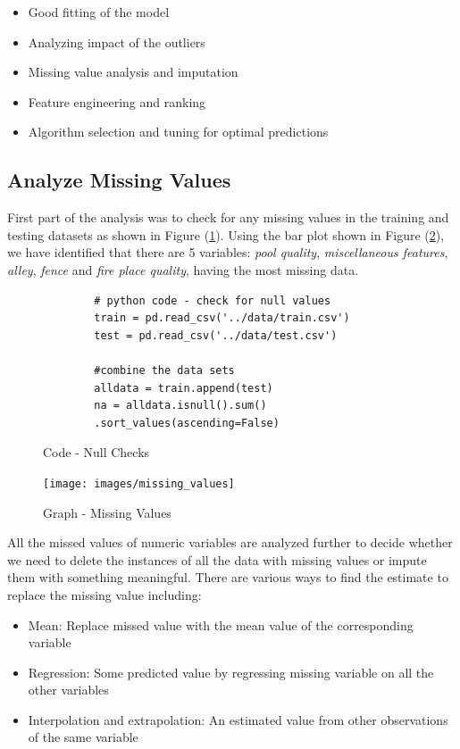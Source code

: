 \documentclass[sigconf]{acmart}
\begin{document}
	\begin{itemize}
		\item Good fitting of the model
		\item Analyzing impact of the outliers
		\item Missing value analysis and imputation
		\item Feature engineering and ranking
		\item Algorithm selection and tuning for optimal predictions
	\end{itemize}
	
	\subsection{Analyze Missing Values}
	
	First part of the analysis was to check for any missing values in the training and testing datasets as shown in Figure (\ref{c:check-nulls}). Using the bar plot shown in Figure (\ref{fig:missing-values}), we have identified that there are 5 variables: {\em pool quality}, {\em miscellaneous features}, {\em alley}, {\em fence} and {\em fire place quality}, having the most missing data. 	
	
	\begin{figure}[htb]
		\begin{verbatim}		
		# python code - check for null values
		train = pd.read_csv('../data/train.csv')
		test = pd.read_csv('../data/test.csv')
		
		#combine the data sets
		alldata = train.append(test)	
		na = alldata.isnull().sum()
		.sort_values(ascending=False)
		\end{verbatim}
		\caption{Code - Null Checks}\label{c:check-nulls}
	\end{figure}
	
	\begin{figure}[htb]
		\centering
		\texttt{[image: images/missing\_values]}	
		\caption{Graph - Missing Values} \label{fig:missing-values} 
	\end{figure}
	
	All the missed values of numeric variables are analyzed further to decide whether we need to delete the instances of all the data with missing values or impute them with something meaningful. There are various ways to find the estimate to replace the missing value including:  
	
	\begin{itemize}
		\item Mean: Replace missed value with the mean value of the corresponding variable
		\item Regression: Some predicted value by regressing missing variable on all the other variables
		\item Interpolation and extrapolation: An estimated value from other observations of the same variable
	\end{itemize}
	
\end{document}
